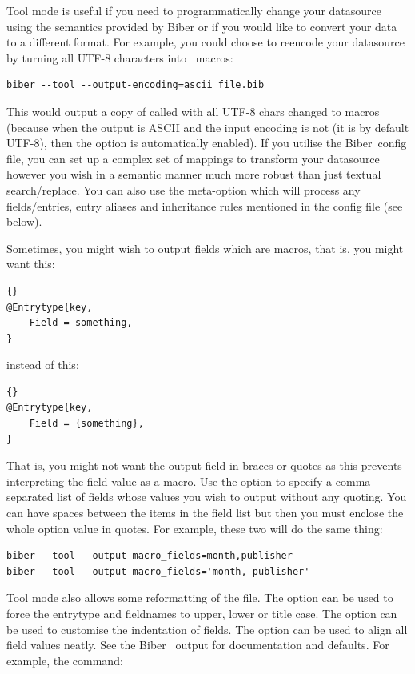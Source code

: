 \documentclass{ltxdockit}
\newcommand*{\biber}{Biber\xspace}
\begin{document}
Tool mode is useful if you need to programmatically change your datasource
using the semantics provided by \biber or if you would like to convert your
data to a different format. For example, you could choose to reencode your
datasource by turning all UTF-8 characters into \latex\ macros:

\begin{verbatim}
biber --tool --output-encoding=ascii file.bib
\end{verbatim}

\noindent This would output a copy of  called  with all
UTF-8 chars changed to \latex macros (because when the output is ASCII and
the input encoding is not (it is by default UTF-8), then the
 option is automatically enabled). If you utilise the \biber\
config file, you can set up a complex set of mappings to transform
your datasource however you wish in a semantic manner much more robust
than just textual search/replace. You can also use the
 meta-option which will process any 
fields/entries, entry aliases and inheritance rules mentioned in the config
file (see below).

Sometimes, you might wish to output fields which are \bibtex macros,
that is, you might want this:

\begin{lstlisting}[style=bibtex, columns=fixed]{}
@Entrytype{key,
    Field = something,
}
\end{lstlisting}
%
instead of this:
\begin{lstlisting}[style=bibtex, columns=fixed]{}
@Entrytype{key,
    Field = {something},
}
\end{lstlisting}
%
That is, you might not want the output field in braces or quotes as
this prevents \bibtex interpreting the field value as a macro. Use the
\opt{--output-macro-fields} option to specify a comma-separated list
of fields whose values you wish to output without any \bibtex
quoting. You can have spaces between the items in the field list but
then you must enclose the whole option value in quotes. For example,
these two will do the same thing:

\begin{verbatim}
biber --tool --output-macro_fields=month,publisher
biber --tool --output-macro_fields='month, publisher'
\end{verbatim}

Tool mode also allows some reformatting of the  file. The
option \opt{--output-fieldcase} can be used to force the entrytype and
fieldnames to upper, lower or title case. The option
 can be used to customise the indentation of
fields. The option  can be used to align all field
values neatly. See the \biber\ \opt{--help} output for documentation
and defaults. For example, the command:
\end{document}
